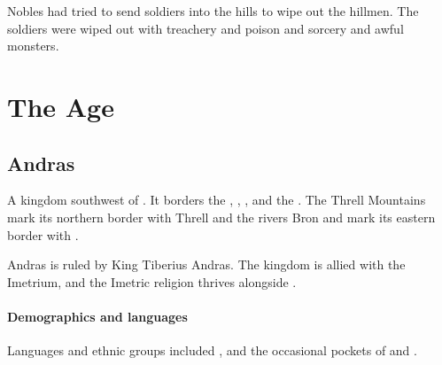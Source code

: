 Nobles had tried to send soldiers into the hills to wipe out the hillmen. 
The soldiers were wiped out with treachery and poison and sorcery and awful monsters. 







































\chapter[The Scatha Age]{The \Scatha Age}















\section{Andras}
A kingdom southwest of . 
It borders the , , ,  and the . 
The Threll Mountains mark its northern border with Threll and the rivers Bron and  mark its eastern border with \Scyrum{}. 

Andras is ruled by King Tiberius Andras. 
The kingdom is allied with the Imetrium, and the Imetric religion thrives alongside . 





\subsubsection{Demographics and languages}
Languages and ethnic groups included ,  and the occasional pockets of  and . 















